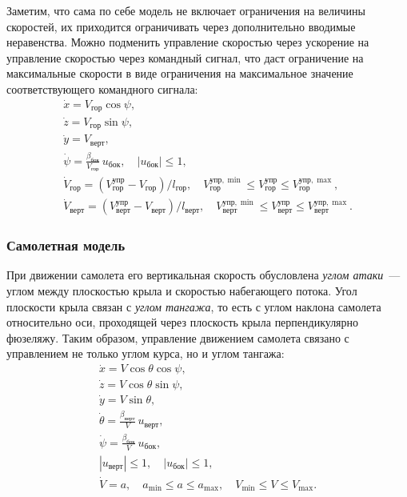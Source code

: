 \documentclass[a4paper,12pt]{article}
\begin{document}
Заметим, что сама по себе модель не включает ограничения на величины скоростей, их приходится ограничивать через дополнительно вводимые неравенства. Можно подменить управление скоростью через ускорение на управление скоростью через командный сигнал, что даст ограничение на максимальные скорости в виде ограничения на максимальное значение соответствующего командного сигнала:
\begin{equation*}
  \begin{array}{l}
    \dot x = V_\text{гор} \cos \psi, \\[0.75ex]
    \dot z = V_\text{гор} \sin \psi, \\[0.75ex]
    \dot y = V_\text{верт}, \\[0.75ex]
    \dot \psi   = \frac{\beta_\text{бок}}{V_\text{гор}} \, u_\text{бок}, \quad |u_\text{бок}| \leqslant 1, \\[0.75ex]
    \dot V_\text{гор} = (V^\text{упр}_\text{гор} - V_\text{гор}) / l_\text{гор}, \quad  
      V^{\text{упр},\min}_\text{гор} \leqslant V^\text{упр}_\text{гор} \leqslant V^{\text{упр},\max}_\text{гор}, \\[0.75ex]
    \dot V_\text{верт} = (V^\text{упр}_\text{верт} - V_\text{верт}) / l_\text{верт}, \quad  
      V^{\text{упр},\min}_\text{верт} \leqslant V^\text{упр}_\text{верт} \leqslant V^{\text{упр},\max}_\text{верт}.
  \end{array}
\end{equation*}


\subsubsection{Самолетная модель}

При движении самолета его вертикальная скорость обусловлена \textit{углом атаки}~--- углом между плоскостью крыла и скоростью набегающего потока. Угол плоскости крыла связан с \textit{углом тангажа}, то есть с углом наклона самолета относительно оси, проходящей через плоскость крыла перпендикулярно фюзеляжу. Таким образом, управление движением самолета связано с управлением не только углом курса, но и углом тангажа:
\begin{equation*}
  \begin{array}{l}
    \dot x = V \cos \theta \cos \psi, \\[0.75ex]
    \dot z = V \cos \theta \sin \psi, \\[0.75ex]
    \dot y = V \sin \theta, \\[0.75ex]
    \dot \theta = \frac{\beta_\text{верт}}{V} \, u_\text{верт}, \\[0.75ex]
    \dot \psi   = \frac{\beta_\text{бок}}{V} \, u_\text{бок}, \\[0.75ex]
    |u_\text{верт}| \leqslant 1, 
      \quad |u_\text{бок}| \leqslant 1, \\[0.75ex]
    \dot V = a, \quad  
      a_{\min} \leqslant a \leqslant a_{\max},
      \quad V_{\min} \leqslant V \leqslant V_{\max}.
  \end{array}
\end{equation*}
\end{document}
